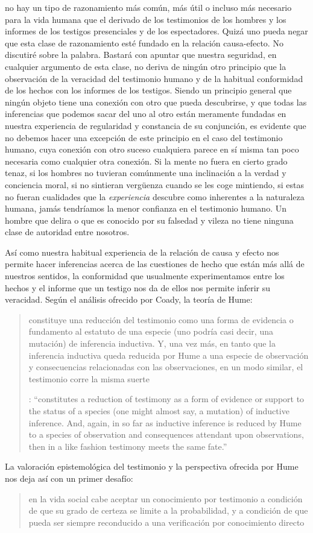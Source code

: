 {no hay un tipo de razonamiento más común, más útil o incluso más necesario para la vida humana que el derivado de los testimonios de los hombres y los informes de los testigos presenciales y de los espectadores. Quizá uno pueda negar que esta clase de razonamiento esté fundado en la relación causa-efecto. No discutiré sobre la palabra. Bastará con apuntar que nuestra seguridad, en cualquier argumento de esta clase, no deriva de ningún otro principio que la observación de la veracidad del testimonio humano y de la habitual conformidad de los hechos con los informes de los testigos. Siendo un principio general que ningún objeto tiene una conexión con otro que pueda descubrirse, y que todas las inferencias que podemos sacar del uno al otro están meramente fundadas en nuestra experiencia de regularidad y constancia de su conjunción, es evidente que no debemos hacer una excepción de este principio en el caso del testimonio humano, cuya conexión con otro suceso cualquiera parece en sí misma tan poco necesaria como cualquier otra conexión. Si la mente no fuera en cierto grado tenaz, si los hombres no tuvieran comúnmente una inclinación a la verdad y conciencia moral, si no sintieran vergüenza cuando se les coge mintiendo, si estas no fueran cualidades que la \emph{experiencia} descubre como inherentes a la naturaleza humana, jamás tendríamos la menor confianza en el testimonio humano. Un hombre que delira o que es conocido por su falsedad y vileza no tiene ninguna clase de autoridad entre nosotros}.

Así como nuestra habitual experiencia de la relación de causa y efecto nos permite hacer inferencias acerca de las cuestiones de hecho que están más allá de nuestros sentidos, la conformidad que usualmente experimentamos entre los hechos y el informe que un testigo nos da de ellos nos permite inferir su veracidad. Según el análisis ofrecido por Coady, la teoría de Hume: \blockquote[{\cite[79]{coady1992test}}: \enquote{constitutes a reduction of testimony as a form of evidence or support to the status of a species (one might almost say, a mutation) of inductive inference. And, again, in so far as inductive inference is reduced by Hume to a species of observation and consequences attendant upon observations, then in a like fashion testimony meets the same fate.}]{constituye una reducción del testimonio como una forma de evidencia o fundamento al estatuto de una especie (uno podría casi decir, una mutación) de inferencia inductiva. Y, una vez más, en tanto que la inferencia inductiva queda reducida por Hume a una especie de observación y consecuencias relacionadas con las observaciones, en un modo similar, el testimonio corre la misma suerte} La valoración epistemológica del testimonio y la perspectiva ofrecida por Hume nos deja así con un primer desafío: \blockquote[{\cite[294]{prades2015testimonio}}]{en la vida social cabe aceptar un conocimiento por testimonio a condición de que su grado de certeza se limite a la probabilidad, y a condición de que pueda ser siempre reconducido a una verificación por conocimiento directo}.


